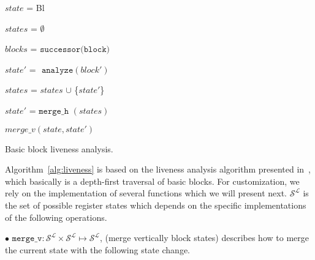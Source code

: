 \begin{algorithm}[h!]
        \footnotesize
 	\SetAlgoLined
        \BlankLine
	{
 	$state$ = Bl 
 	

	$states$ = $\emptyset$                                                 
	
	$blocks$ = $\texttt{successor(block)}$                                   
	
	 {
	
 		$state'$ = $\texttt{ analyze}(block')$   
 		
		$states$ = $states$ $\cup$ \{$state'$\}  
	}

	$state'$ = $\texttt{merge\_h }(states)$   

	\Return $merge\_v(state, state')$  

	}
\caption{Basic block liveness analysis.}
\label{alg:liveness}
\end{algorithm}
Algorithm~\ref{alg:liveness} is based on the liveness analysis algorithm presented in~\cite{khedker2009data}, which basically is a depth-first traversal of basic blocks. 
For customization, we rely on the implementation of several functions which we will present next. $\mathcal{S}^\mathcal{L}$ is the set of possible register states which depends on the specific 
implementations of the following operations.

$\bullet$ $\texttt{merge\_v} : \mathcal{S}^\mathcal{L} \times \mathcal{S}^\mathcal{L} \mapsto \mathcal{S}^\mathcal{L}$, (merge vertically block states) describes how to merge the current state with the following state change.

